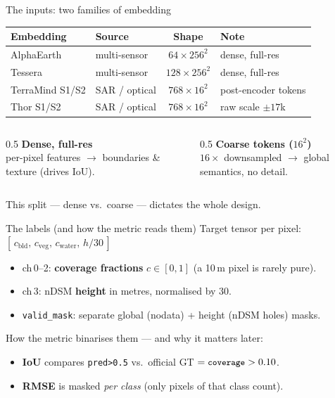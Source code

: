 \documentclass[aspectratio=169,11pt]{beamer}
\newcommand{\code}[1]{\texttt{\small #1}}
\begin{document}
\begin{frame}{The inputs: two families of embedding}
  \begin{center}\small
  \begin{tabular}{llcl}
    \toprule
    Embedding & Source & Shape & Note\\
    \midrule
    \textcolor{cAlpha}{AlphaEarth} & multi-sensor & $64\times256^2$ & dense, full-res\\
    \textcolor{cAlpha}{Tessera}    & multi-sensor & $128\times256^2$ & dense, full-res\\
    \textcolor{cToken}{TerraMind S1/S2} & SAR / optical & $768\times16^2$ & post-encoder tokens\\
    \textcolor{cToken}{Thor S1/S2}      & SAR / optical & $768\times16^2$ & raw scale $\pm17$k\\
    \bottomrule
  \end{tabular}
  \end{center}

  \vspace{0.6em}
  \begin{columns}[T]
    \begin{column}{0.5\textwidth}
      \textcolor{cAlpha}{\textbf{Dense, full-res}}\\
      \footnotesize per-pixel features $\to$ boundaries \& texture (drives IoU).
    \end{column}
    \begin{column}{0.5\textwidth}
      \textcolor{cToken}{\textbf{Coarse tokens ($16^2$)}}\\
      \footnotesize $16\times$ downsampled $\to$ global semantics, no detail.
    \end{column}
  \end{columns}

  \vspace{0.5em}
  \footnotesize This split --- dense vs.\ coarse --- dictates the whole design.
\end{frame}

\begin{frame}{The labels (and how the metric reads them)}
  Target tensor per pixel: $[\,c_{\text{bld}},\,c_{\text{veg}},\,c_{\text{water}},\,h/30\,]$
  \begin{itemize}
    \item ch\,0--2: \textbf{coverage fractions} $c\in[0,1]$ (a 10\,m pixel is rarely pure).
    \item ch\,3: nDSM \textbf{height} in metres, normalised by 30.
    \item \code{valid\_mask}: separate global (nodata) + height (nDSM holes) masks.
  \end{itemize}
  \vspace{0.4em}
  How the metric binarises them --- and why it matters later:
  \begin{itemize}
    \item \textbf{IoU} compares \code{pred>0.5} vs.\ official GT $=\code{coverage}>0.10$.
    \item \textbf{RMSE} is masked \emph{per class} (only pixels of that class count).
  \end{itemize}
\end{frame}
\end{document}
